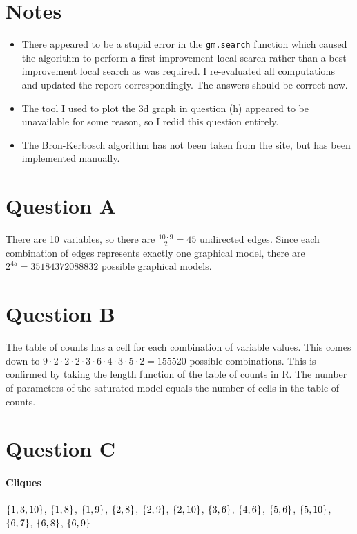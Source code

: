 \documentclass[12pt]{article}
\theoremstyle{definition}
\begin{document}
\maketitle

\section*{Notes}
\begin{itemize}
    \item There appeared to be a stupid error in the \texttt{gm.search} function which caused the algorithm to perform a first improvement local search rather than a best improvement local search as was required. I re-evaluated all computations and updated the report correspondingly.
The answers should be correct now.
    \item The tool I used to plot the 3d graph in question (h) appeared to be unavailable for some reason, so I redid this question entirely.
    \item The Bron-Kerbosch algorithm has not been taken from the site, but has been implemented manually.
\end{itemize}

\section*{Question A}
There are 10 variables, so there are $\frac{10 \cdot 9}{2} = 45$ undirected edges.
Since each combination of edges represents exactly one graphical model,
there are $2^{45} = 35184372088832$ possible graphical models.

\section*{Question B}
The table of counts has a cell for each combination of variable values.
This comes down to $9 \cdot 2 \cdot 2 \cdot 2 \cdot 3 \cdot 6 \cdot 4 \cdot 3 \cdot 5 \cdot 2 = 155520$ possible combinations.
This is confirmed by taking the length function of the table of counts in R.
The number of parameters of the saturated model equals the number of cells in the table of counts.

\section*{Question C}
\paragraph{Cliques}
$\set{1,3,10}$, $\set{1,8}$, $\set{1,9}$, $\set{2,8}$, $\set{2,9}$, $\set{2,10}$, $\set{3,6}$,
$\set{4,6}$, $\set{5,6}$, $\set{5,10}$, $\set{6,7}$, $\set{6,8}$, $\set{6, 9}$
\end{document}
